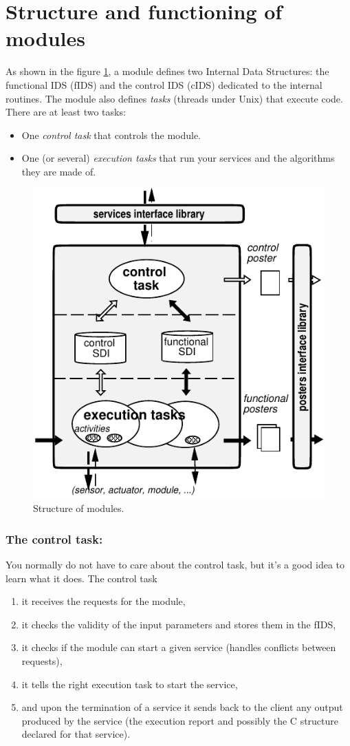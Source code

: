
\section{Structure and functioning of modules}
\label{sec|module|module}

As shown in the figure  \ref{fig|module}, a  module defines two  Internal
Data Structures:  the functional IDS (fIDS)  and  the control  IDS (cIDS)
dedicated to the internal routines.  The module also defines \emph{tasks}
(threads under Unix) that execute code. There are at least two tasks:

\begin{itemize}
\item One \emph{control task} that controls the module.
\item One (or several) \emph{execution tasks} that run your services and
the algorithms they are made of.
\end{itemize}

\begin{figure}[htbp]
\centering
\includegraphics[width=0.5\hsize]{fig/module-en}
\caption{Structure of modules.}
\label{fig|module}
\end{figure}

\subsubsection{The control task:}

You normally do not have to care about the control task, but it's a good
idea to learn what it does. The control task

\begin{enumerate}
\item it receives the requests for the module,
\item it checks the validity of the input parameters and stores them in the fIDS,
\item it checks if the module can start a given service (handles conflicts
between requests),
\item it tells the right execution task to start the service,
\item and upon the termination of a service it sends back to the client
any output produced by the service (the execution report and possibly the
C structure declared for that service).
\end{enumerate}

